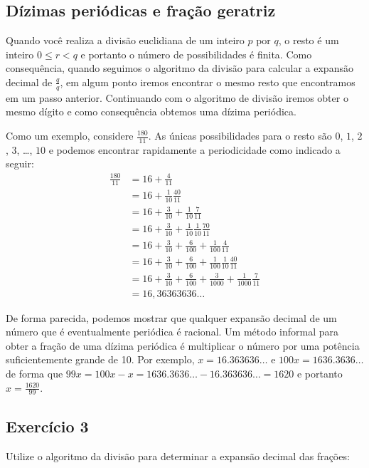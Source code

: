 \subsection*{Dízimas periódicas e fração geratriz}

Quando você realiza a divisão euclidiana de um inteiro $p$ por $q$, o resto é um
inteiro $0 \leq r < q$ e portanto o número de possibilidades é finita. Como
consequência, quando seguimos o algoritmo da divisão para calcular a expansão
decimal de $\frac{q}{q}$, em algum ponto iremos encontrar o mesmo resto que
encontramos em um passo anterior. Continuando com o algoritmo de divisão iremos
obter o mesmo dígito e como consequência obtemos uma dízima periódica.

Como um exemplo, considere $\frac{180}{11}$. As únicas possibilidades para o
resto são $0$, $1$, $2$, $3$, \ldots, $10$ e podemos encontrar rapidamente a
periodicidade como indicado a seguir:
\begin{align*}
  \frac{180}{11} &= 16 + \frac{4}{11} \\
  &= 16 + \frac{1}{10} \frac{40}{11} \\
  &= 16 + \frac{3}{10} + \frac{1}{10} \frac{7}{11} \\
  &= 16 + \frac{3}{10} + \frac{1}{10} \frac{1}{10} \frac{70}{11} \\
  &= 16 + \frac{3}{10} + \frac{6}{100} + \frac{1}{100} \frac{4}{11} \\
  &= 16 + \frac{3}{10} + \frac{6}{100} + \frac{1}{100} \frac{1}{10} \frac{40}{11} \\
  &= 16 + \frac{3}{10} + \frac{6}{100} + \frac{3}{1000} + \frac{1}{1000} \frac{7}{11} \\
  &= 16,36363636\ldots
\end{align*}

De forma parecida, podemos mostrar que qualquer expansão decimal de um número
que é eventualmente periódica é racional. Um método informal para obter a fração
de uma dízima periódica é multiplicar o número por uma potência suficientemente
grande de 10. Por exemplo, $x = 16.363636\ldots$ e $100 x = 1636.3636\ldots$ de
forma que $99 x = 100 x - x = 1636.3636\ldots - 16.363636\ldots = 1620$ e
portanto $x = \frac{1620}{99}$.

\subsection*{Exercício 3}

Utilize o algoritmo da divisão para determinar a expansão decimal das frações:

